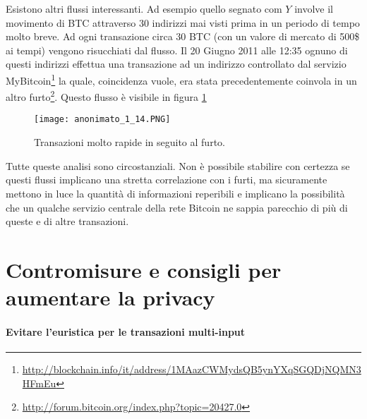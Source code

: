 Esistono altri flussi interessanti. Ad esempio quello segnato com $Y$ involve il movimento di BTC attraverso 30 indirizzi mai visti prima in un periodo di tempo molto breve. Ad ogni transazione circa 30 BTC (con un valore di mercato di 500\$ ai tempi) vengono risucchiati dal flusso. Il 20 Giugno 2011 alle 12:35 ognuno di questi indirizzi effettua una transazione ad un indirizzo controllato dal servizio MyBitcoin\footnote{\url{http://blockchain.info/it/address/1MAazCWMydsQB5ynYXqSGQDjNQMN3HFmEu}} la quale, coincidenza vuole, era stata precedentemente coinvola in un altro furto\footnote{\url{http://forum.bitcoin.org/index.php?topic=20427.0}}. Questo flusso è visibile in figura \ref{anonimato_1_14}

\begin{figure}[htbp]
\centering
\texttt{[image: anonimato\_1\_14.PNG]}
\caption{Transazioni molto rapide in seguito al furto.\label{anonimato_1_14}}
\end{figure}

Tutte queste analisi sono circostanziali. Non è possibile stabilire con certezza se questi flussi implicano una stretta correlazione con i furti, ma sicuramente mettono in luce la quantità di informazioni reperibili e implicano la possibilità che un qualche servizio centrale della rete Bitcoin ne sappia parecchio di più di queste e di altre transazioni.

\section{Contromisure e consigli per aumentare la privacy}

\paragraph{Evitare l'euristica per le transazioni multi-input}

